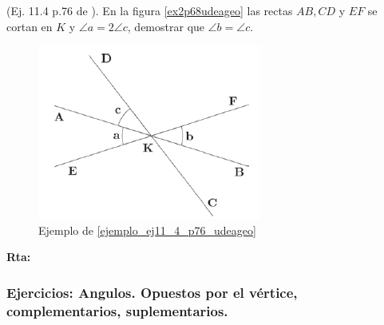 \begin{ejemplo} \label{ejemplo_ej11_4_p76_udeageo}
	(Ej. 11.4 p.76 de \cite{Udea_geometria}). En la figura \ref{ex2p68udeageo} las rectas $AB,CD$ y $EF$ se cortan en $K$ y $\angle a= 2\angle c$, demostrar que $\angle b = \angle c$.
	
	\begin{figure}[H]
		\centering
		\includegraphics[width=0.5\linewidth]{Geometria/imgs/ej11_4_p76_udeageo}
		\caption{Ejemplo de \ref{ejemplo_ej11_4_p76_udeageo}}
		\label{ej11_4_p76_udeageo}
	\end{figure}
	\textbf{Rta:} 
\end{ejemplo}

\newpage
\begin{center}
	\vspace{-1cm}
	\subsubsection{Ejercicios: Angulos. Opuestos por el vértice, complementarios, suplementarios.} \label{ejercicios_subsection_opuestosvertices_complementarios_suplementarios}
\end{center}

